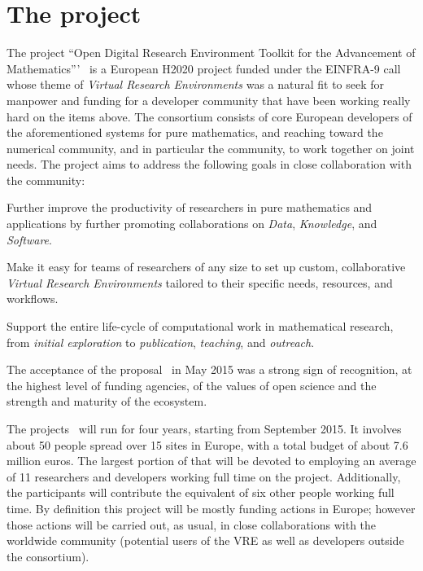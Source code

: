 \section{The \ODK project}\label{sec:odk}
The project ``Open Digital Research Environment Toolkit for the Advancement of
Mathematics'''~\cite{OpenDreamKit:on} is a European H2020 project funded under the
EINFRA-9 call~\cite{EINFRA-9} whose theme of \emph{Virtual Research Environments} was a
natural fit to seek for manpower and funding for a developer community that have been
working really hard on the items above. The \ODK consortium consists of core European
developers of the aforementioned systems for pure mathematics, and reaching toward the
numerical community, and in particular the \Jupyter community, to work together on joint
needs. The project aims to address the following goals in close collaboration with the
community:
\begin{compactenum}
\item Further improve the productivity of researchers in pure mathematics and applications
  by further promoting collaborations on \emph{Data}, \emph{Knowledge}, and
  \emph{Software}.
\item Make it easy for teams of researchers of any size to set up custom, collaborative
  \emph{Virtual Research Environments} tailored to their specific needs, resources, and
  workflows.
\item Support the entire life-cycle of computational work in mathematical research, from
  \emph{initial exploration} to \emph{publication}, \emph{teaching}, and \emph{outreach}.
\end{compactenum}
The acceptance of the proposal~\cite{ODKproposal:on} in May 2015 was a strong sign of
recognition, at the highest level of funding agencies, of the values of open science and
the strength and maturity of the ecosystem.

The \ODK projects~\cite{ODKproposal:on} will run for four years, starting from September
2015. It involves about 50 people spread over 15 sites in Europe, with a total budget of
about 7.6 million euros. The largest portion of that will be devoted to employing an
average of 11 researchers and developers working full time on the project. Additionally,
the participants will contribute the equivalent of six other people working full time.  By
definition this project will be mostly funding actions in Europe; however those actions
will be carried out, as usual, in close collaborations with the worldwide community
(potential users of the VRE as well as developers outside the \ODK consortium).

